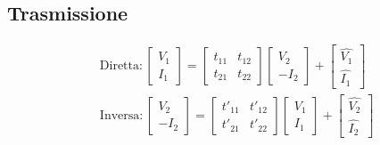 \documentclass{article}
\begin{document}
\begin{minipage}[t]{.5\textwidth}
            \subsection*{Trasmissione}
            \vspace{-\baselineskip}

                \begin{align*}
                    &\text{Diretta}:
                        \begin{bmatrix}
                            V_1\\
                            I_1
                        \end{bmatrix}
                        =
                        \begin{bmatrix}
                            t_{11} & t_{12}\\
                            t_{21} & t_{22}
                        \end{bmatrix}
                        \begin{bmatrix}
                            V_2\\
                            -I_2
                        \end{bmatrix}
                        +
                        \begin{bmatrix}
                            \hat{V_1}\\
                            \hat{I_1}
                        \end{bmatrix}\\
                    &\text{Inversa}:
                        \begin{bmatrix}
                            V_2\\
                            -I_2
                        \end{bmatrix}
                        =
                        \begin{bmatrix}
                            t'_{11} & t'_{12}\\
                            t'_{21} & t'_{22}
                        \end{bmatrix}
                        \begin{bmatrix}
                            V_1\\
                            I_1
                        \end{bmatrix}
                        +
                        \begin{bmatrix}
                            \hat{V_2}\\
                            \hat{I_2}
                        \end{bmatrix}
                \end{align*}

        \end{minipage}
\end{document}
